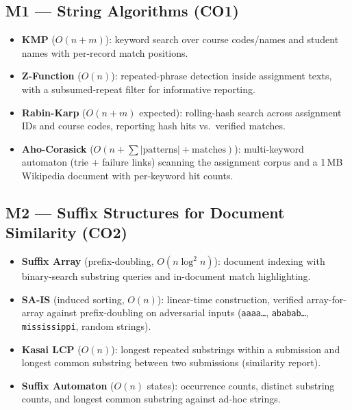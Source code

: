 \documentclass[11pt,a4paper]{article}
\begin{document}
\subsection{M1 --- String Algorithms (CO1)}
\begin{itemize}
    \item \textbf{KMP} ($O(n+m)$): keyword search over course codes/names and student
    names with per-record match positions.
    \item \textbf{Z-Function} ($O(n)$): repeated-phrase detection inside assignment
    texts, with a subsumed-repeat filter for informative reporting.
    \item \textbf{Rabin-Karp} ($O(n+m)$ expected): rolling-hash search across assignment
    IDs and course codes, reporting hash hits vs.\ verified matches.
    \item \textbf{Aho-Corasick} ($O(n + \sum |\text{patterns}| + \text{matches})$):
    multi-keyword automaton (trie + failure links) scanning the assignment corpus and a
    1\,MB Wikipedia document with per-keyword hit counts.
\end{itemize}

\subsection{M2 --- Suffix Structures for Document Similarity (CO2)}
\begin{itemize}
    \item \textbf{Suffix Array} (prefix-doubling, $O(n \log^2 n)$): document indexing
    with binary-search substring queries and in-document match highlighting.
    \item \textbf{SA-IS} (induced sorting, $O(n)$): linear-time construction, verified
    array-for-array against prefix-doubling on adversarial inputs
    (\texttt{aaaa\ldots}, \texttt{ababab\ldots}, \texttt{mississippi}, random strings).
    \item \textbf{Kasai LCP} ($O(n)$): longest repeated substrings within a submission
    and longest common substring between two submissions (similarity report).
    \item \textbf{Suffix Automaton} ($O(n)$ states): occurrence counts, distinct
    substring counts, and longest common substring against ad-hoc strings.
\end{itemize}
\end{document}
